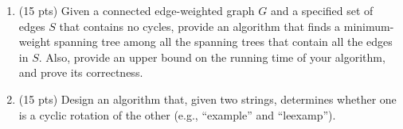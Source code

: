 \documentclass{article}
\begin{document}
\begin{enumerate}
\newpage

\item (15 pts) Given a connected edge-weighted graph $G$ and a specified set of edges $S$ that contains no cycles, provide an algorithm that finds a minimum-weight spanning tree among all the spanning trees that contain all the edges in $S$. Also, provide an upper bound on the running time of your algorithm, and prove its correctness.

\newpage

\item (15 pts) Design an algorithm that, given two strings, determines whether one is a cyclic rotation of the other (e.g., ``example'' and ``leexamp'').

\end{enumerate}
\end{document}
